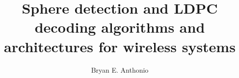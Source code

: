 \documentclass[12pt]{ruthesis}
\title{Sphere detection and LDPC decoding algorithms and architectures for wireless systems}
\author{Bryan E. Anthonio}
\begin{document}
  \begin{frontmatter}
   \maketitle
   
   \tableofcontents
   \listoffigures
   \listoftables
%   
  \end{frontmatter}




\appendix

%
%
%
%

%
%
\end{document}
